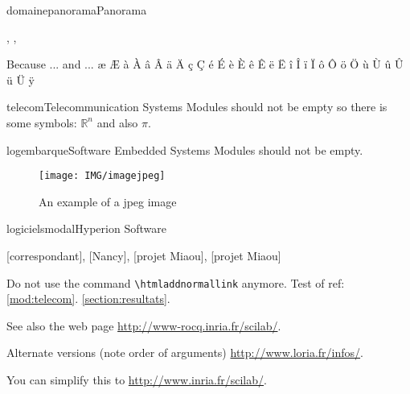 \documentclass{ra2015}
\begin{document}
\begin{module}{domaine}{panorama}{Panorama}
\begin{participants}
  ,
  ,
\end{participants}


Because ... and ... æ Æ à À â Â ä Ä ç Ç é É è È ê Ê ë Ë î Î ï Ï ô Ô ö Ö ù Ù û Û ü Ü ÿ

\end{module}

\begin{module}{}{telecom}{Telecommunication Systems}
Modules should not be empty so there is  some symbols: $\mathbb{R}^n$ and also $\pi$.
\end{module}

\begin{module}{}{logembarque}{Software Embedded Systems}
Modules should not be empty.

\begin{figure}
\begin{center}
\texttt{[image: IMG/imagejpeg]}
\end{center}
\caption{An example of a jpeg image}
\label{fig:jpegimage}
\end{figure}

\end{module}



\begin{module}{logiciels}{modal}{Hyperion Software} 
\begin{participants}
  [correspondant],
  [Nancy],
  [projet Miaou],
  [projet Miaou]
\end{participants}

Do not use the command \verb=\htmladdnormallink= anymore.
Test of ref: \ref{mod:telecom}. \ref{section:resultats}.

See also the web page
\href {http://www-rocq.inria.fr/scilab/}{\url{http://www-rocq.inria.fr/scilab/}}.

Alternate versions (note order of arguments)
\href{http://www.loria.fr/info/}{\url{http://www.loria.fr/infos/}}.

You can simplify this to 
\url{http://www.inria.fr/scilab/}.
\end{module}
\end{document}
